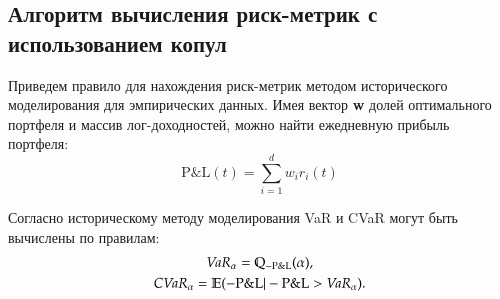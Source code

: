 %




\subsection{Алгоритм вычисления риск-метрик с использованием копул}


Приведем правило для нахождения риск-метрик методом исторического моделирования для эмпирических данных. 
Имея вектор \textbf{w} долей оптимального портфеля и массив лог-доходностей, можно найти ежедневную прибыль портфеля:
\begin{equation} \label{PnL}
    \text{P\&L}(t) = \sum_{i=1}^d w_i r_i(t)
\end{equation}

Согласно историческому методу моделирования VaR и CVaR могут быть вычислены по правилам:
\begin{gather}
    \emph{VaR}_\alpha = \mathbb{Q}_{-\text{P\&L}}  (\alpha),
    \label{VaR-hist} \\
	\emph{CVaR}_\alpha = \mathbb{E} (-\text{P\&L}|-\text{P\&L} > \emph{VaR}_\alpha).
	\label{ES-hist}
\end{gather}
%

